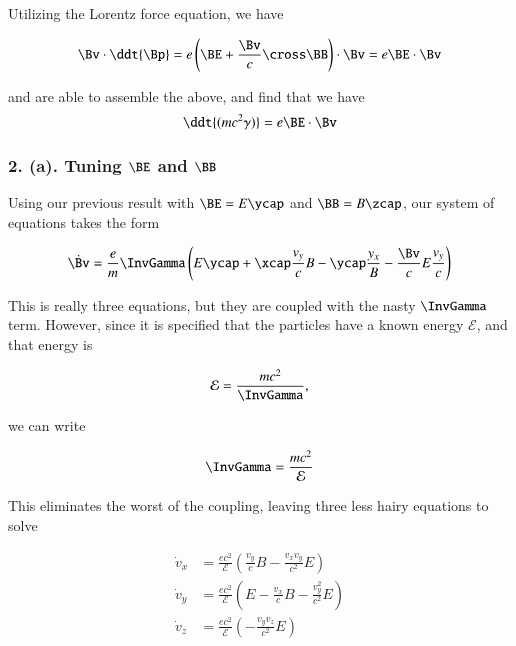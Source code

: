 Utilizing the Lorentz force equation, we have

\begin{equation}\label{eqn:relElectroDynProblemSet2:250}
\Bv \cdot \ddt{\Bp} = e \left( \BE + \frac{\Bv}{c} \cross \BB \right) \cdot \Bv = e \BE \cdot \Bv
\end{equation}

and are able to assemble the above, and find that we have
\begin{equation}\label{eqn:relElectroDynProblemSet2:270}
\ddt{(m c^2 \gamma)} = e \BE \cdot \Bv 
\end{equation}

\subsubsection{2. (a). Tuning $\BE$ and $\BB$}

Using our previous result with $\BE = E \ycap$ and $\BB = B \zcap$, our system of equations takes the form

\begin{equation}\label{eqn:relElectroDynProblemSet2:290}
\dot{\Bv} = \frac{e}{m} \InvGamma \left( E \ycap + \xcap \frac{v_y}{c} B - \ycap \frac{y_x} B - \frac{\Bv}{c} E \frac{v_y}{c} \right)
\end{equation}

This is really three equations, but they are coupled with the nasty $\InvGamma$ term.  However, since it is specified that the particles have a known energy $\mathcal{E}$, and that energy is

\begin{equation}\label{eqn:relElectroDynProblemSet2:310}
\mathcal{E} = \frac{ m c^2 }{\InvGamma},
\end{equation}

we can write

\begin{equation}\label{eqn:relElectroDynProblemSet2:330}
\InvGamma = \frac{ m c^2 }{\mathcal{E}}
\end{equation}

This eliminates the worst of the coupling, leaving three less hairy equations to solve

\begin{align}\label{eqn:relElectroDynProblemSet2:350}
\dot{v}_x &= \frac{e c^2}{\mathcal{E}} \left( \frac{v_y}{c} B - \frac{v_x v_y}{c^2} E \right) \\
\dot{v}_y &= \frac{e c^2}{\mathcal{E}} \left( E - \frac{v_x}{c} B - \frac{v_y^2}{c^2} E \right) \\
\dot{v}_z &= \frac{e c^2}{\mathcal{E}} \left( - \frac{v_y v_z}{c^2} E \right)
\end{align}

